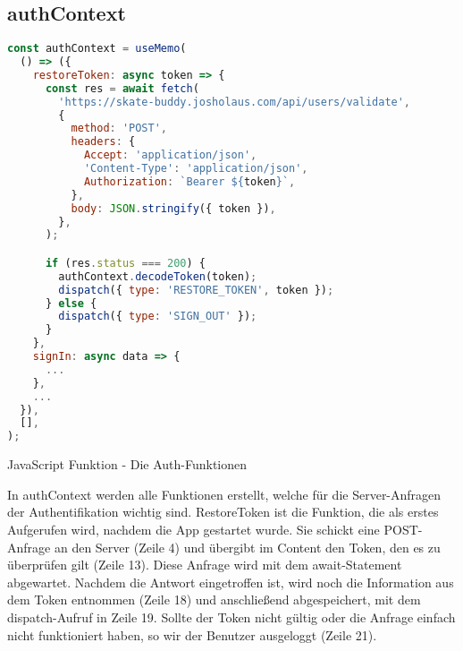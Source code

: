 \subsection{authContext}
\begin{code}[htp]
\begin{lstlisting}[firstnumber=1,language=JavaScript, style=JSX]
const authContext = useMemo(
  () => ({
    restoreToken: async token => {
      const res = await fetch(
        'https://skate-buddy.josholaus.com/api/users/validate',
        {
          method: 'POST',
          headers: {
            Accept: 'application/json',
            'Content-Type': 'application/json',
            Authorization: `Bearer ${token}`,
          },
          body: JSON.stringify({ token }),
        },
      );

      if (res.status === 200) {
        authContext.decodeToken(token);
        dispatch({ type: 'RESTORE_TOKEN', token });
      } else {
        dispatch({ type: 'SIGN_OUT' });
      }
    },
    signIn: async data => {
      ...
    },
    ...
  }),
  [],
);
\end{lstlisting}
\caption{JavaScript Funktion - Die Auth-Funktionen}
\end{code}

In authContext werden alle Funktionen erstellt, welche für die Server-Anfragen der Authentifikation
wichtig sind. RestoreToken ist die Funktion, die als erstes Aufgerufen wird, nachdem die App
gestartet wurde. Sie schickt eine POST-Anfrage an den Server (Zeile 4) und übergibt im Content den
Token, den es zu überprüfen gilt (Zeile 13). Diese Anfrage wird mit dem await-Statement abgewartet.
Nachdem die Antwort eingetroffen ist, wird noch die Information aus dem Token entnommen (Zeile 18)
und anschließend abgespeichert, mit dem dispatch-Aufruf in Zeile 19. Sollte der Token nicht gültig
oder die Anfrage einfach nicht funktioniert haben, so wir der Benutzer ausgeloggt (Zeile 21).
